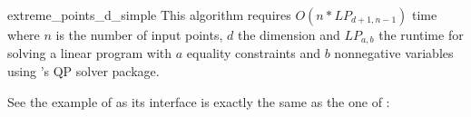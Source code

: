 \begin{ccRefFunction}{extreme_points_d_simple}
This algorithm requires $O(n * LP_{d+1,n-1})$ time where $n$ is the number of input points, $d$ the dimension and $LP_{a,b}$ the runtime for solving a linear program with $a$ equality constraints and $b$ nonnegative variables using \cgal's QP solver package.

\ccExample
See the example of  as its interface is exactly the same as the one of \ccRefName:


\end{ccRefFunction}

\ccRefPageEnd

